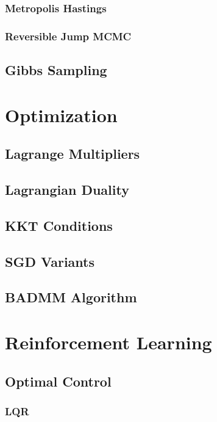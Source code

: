\documentclass[12pt]{article}
\begin{document}
\subsubsection{Metropolis Hastings}

\subsubsection{Reversible Jump MCMC}

\subsection{Gibbs Sampling}

\section{Optimization}

\subsection{Lagrange Multipliers}

\subsection{Lagrangian Duality}

\subsection{KKT Conditions}

\subsection{SGD Variants}

\subsection{BADMM Algorithm}

\section{Reinforcement Learning}

\subsection{Optimal Control}

\subsubsection{LQR}
\end{document}
